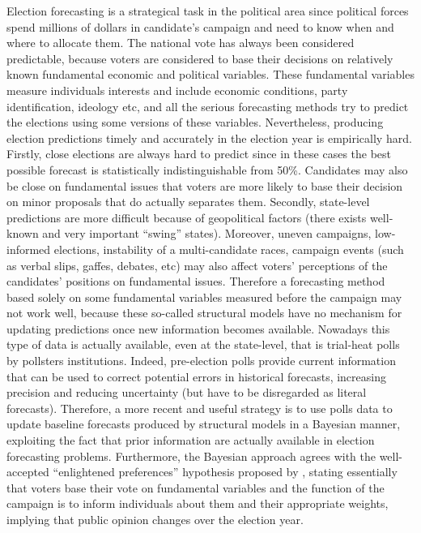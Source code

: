 \documentclass[
  12pt]{article}
\begin{document}
Election forecasting is a strategical task in the political area since
political forces spend millions of dollars in candidate's campaign and
need to know when and where to allocate them. The national vote has
always been considered predictable, because voters are considered to
base their decisions on relatively known fundamental economic and
political variables. These fundamental variables measure individuals
interests and include economic conditions, party identification,
ideology etc, and all the serious forecasting methods try to predict the
elections using some versions of these variables. Nevertheless,
producing election predictions timely and accurately in the election
year is empirically hard. Firstly, close elections are always hard to
predict since in these cases the best possible forecast is statistically
indistinguishable from 50\%. Candidates may also be close on fundamental
issues that voters are more likely to base their decision on minor
proposals that do actually separates them. Secondly, state-level
predictions are more difficult because of geopolitical factors (there
exists well-known and very important ``swing'' states). Moreover, uneven
campaigns, low-informed elections, instability of a multi-candidate
races, campaign events (such as verbal slips, gaffes, debates, etc) may
also affect voters' perceptions of the candidates' positions on
fundamental issues. Therefore a forecasting method based solely on some
fundamental variables measured before the campaign may not work well,
because these so-called structural models have no mechanism for updating
predictions once new information becomes available. Nowadays this type
of data is actually available, even at the state-level, that is
trial-heat polls by pollsters institutions. Indeed, pre-election polls
provide current information that can be used to correct potential errors
in historical forecasts, increasing precision and reducing uncertainty
(but have to be disregarded as literal forecasts). Therefore, a more
recent and useful strategy is to use polls data to update baseline
forecasts produced by structural models in a Bayesian manner, exploiting
the fact that prior information are actually available in election
forecasting problems. Furthermore, the Bayesian approach agrees with the
well-accepted ``enlightened preferences'' hypothesis proposed by
\citet{gel:kin:1993}, stating essentially that voters base their vote on
fundamental variables and the function of the campaign is to inform
individuals about them and their appropriate weights, implying that
public opinion changes over the election year.
\end{document}
